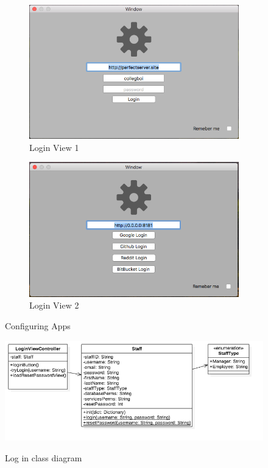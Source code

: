 \begin{figure}[!h]
    \begin{subfigure}{0.5\textwidth}
        \includegraphics[width=0.9\linewidth]{images/dashboard/login}
        \caption{Login View 1}
        \label{fig:log-in-view}
    \end{subfigure}
    \begin{subfigure}{0.5\textwidth}
        \includegraphics[width=0.9\linewidth]{images/dashboard/oauth_view}
        \caption{Login View 2}
        \label{fig:oauth-view}
    \end{subfigure}
\caption{Configuring Apps}
\label{fig:Login View}
\end{figure}

\begin{figure}[!h]
    \caption{Log in class diagram}
    \centering
    \includegraphics[width=150mm]{images/classdiagrams/Login}
    \label{fig:login_cd}
\end{figure}

